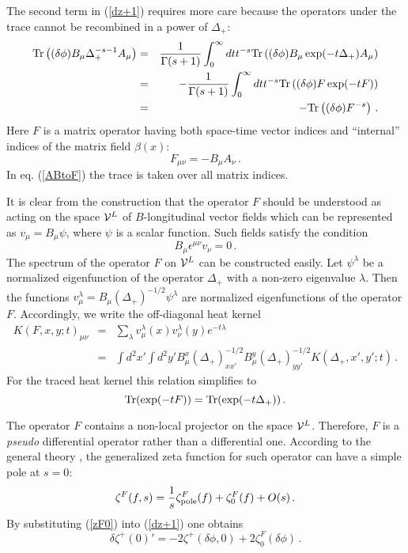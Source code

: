 \documentclass[a4paper,12pt]{article}
\begin{document}
The second term in (\ref{dz+1}) requires more care
because the operators under the trace cannot be
recombined in a power of $\Delta_+$: 
\begin{eqnarray}
{\rm Tr}\left( (\delta \phi )B_\mu \Delta_+^{-s-1} A_\mu \right)
&=&\frac 1{\Gamma (s+1)} \int_0^\infty dt t^{-s}
{\rm Tr}\left((\delta \phi )B_\mu \exp (-t\Delta_+ )A_\mu \right)
\nonumber \\
&=&-\frac 1{\Gamma (s+1)} \int_0^\infty dt t^{-s}
{\rm Tr}\left((\delta \phi ) F \exp (-tF) \right) \nonumber \\
&=&-{\rm Tr}\left( (\delta \phi ) F^{-s}
\right)\,.
\label{ABtoF}
\end{eqnarray}
Here $F$ is a matrix operator having both space-time vector indices
and ``internal'' indices of the matrix field $\beta (x)$: 
\begin{equation}
F_{\mu\nu}=-B_\mu A_\nu \label{defF} \,.
\end{equation}
In eq. (\ref{ABtoF}) the trace is taken over all matrix indices.

It is clear from the construction that the operator $F$ should
be understood as acting on the space ${\cal V}^L$ of $B$-longitudinal
vector fields which can be represented as $v_\mu =B_\mu \psi$,
where $\psi$ is a scalar function. Such fields satisfy the condition
\begin{equation}
B_\mu \epsilon^{\mu\nu}v_\nu =0 \,.\label{cond1}
\end{equation}
The spectrum of the operator $F$ on ${\cal V}^L$ can be
constructed easily. Let $\psi^\lambda$ be a normalized
 eigenfunction of the
operator $\Delta_+$ with a non-zero eigenvalue $\lambda$.
Then the functions 
$v^\lambda_\mu = B_\mu (\Delta_+)^{-1/2} \psi^\lambda$ 
are normalized eigenfunctions of the operator $F$.
Accordingly, we write the off-diagonal heat kernel 
\begin{eqnarray}
K(F,x,y;t)_{\mu\nu}&=&
\sum_{\lambda} v^\lambda_\mu (x) v^\lambda_\nu (y) e^{-t\lambda}
\nonumber \\ 
&=&\int d^2x'\int d^2y' B_\mu^x (\Delta_+ )^{-1/2}_{xx'}
B_\mu^y (\Delta_+ )^{-1/2}_{yy'} K(\Delta_+,x',y';t)\,.
\label{KF}
\end{eqnarray} 
For the traced heat kernel this relation simplifies to
\begin{equation}
{\rm Tr}(\exp (-tF)) ={\rm Tr}(\exp (-t\Delta_+)) \,.
\label{hkFd+}
\end{equation}

The operator $F$ contains a non-local projector on the
space ${\cal V}^L$. Therefore, $F$ is a {\it pseudo}
differential operator rather than a differential one. According to the
general theory \cite{Gilkey95}, the generalized zeta
function for such operator can have a simple pole
at $s=0$:
\begin{equation}
\zeta^F (f,s)=\frac 1s \zeta^F_{\mbox{\scriptsize pole}}(f)
+\zeta^F_0 (f)+O(s) \,.
\label{zF0}
\end{equation}
By substituting (\ref{zF0}) into (\ref{dz+1}) one obtains
\begin{equation}
\delta\zeta^+(0)'=-2\zeta^+ (\delta \phi ,0)
+2 \zeta^F_0 (\delta\phi ) \,. \label{dz+2}
\end{equation}
\end{document}
